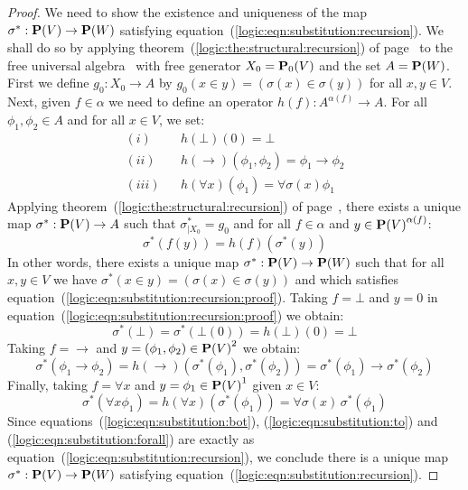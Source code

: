 \begin{proof}
    We need to show the existence and uniqueness of the map
    $\sigma^{*}:\mbox{${\bf P}(V)$}\to{\bf P}(W)$ satisfying
    equation~(\ref{logic:eqn:substitution:recursion}). We shall do so by
    applying theorem~(\ref{logic:the:structural:recursion}) of
    page~\pageref{logic:the:structural:recursion} to the free universal
    algebra \pv\ with free generator $X_{0}=\mbox{${\bf P}_{0}(V)$}$ and the set $A={\bf
    P}(W)$. First we define $g_{0}:X_{0}\to A$ by $g_{0}(x\in
    y)=(\sigma(x)\in\sigma(y))$ for all $x,y\in V$. Next, given
    $f\in\alpha$ we need to define an operator $h(f):A^{\alpha(f)}\to
    A$. For all $\phi_{1},\phi_{2}\in A$ and for all $x\in V$, we set:
    \begin{eqnarray*}
        (i)&&h(\bot)(0)=\bot
        \\
        (ii)&&h(\to)(\phi_{1},\phi_{2})=\phi_{1}\to\phi_{2}
        \\
        (iii)&&h(\forall x)(\phi_{1})=\forall \sigma(x)\phi_{1}
    \end{eqnarray*}
    Applying theorem~(\ref{logic:the:structural:recursion}) of
    page~\pageref{logic:the:structural:recursion}, there exists a unique
    map $\sigma^{*}:\mbox{${\bf P}(V)$}\to A$ such that $\sigma^{*}_{|X_{0}}=g_{0}$ and
    for all $f\in\alpha$ and $y\in\mbox{${\bf P}(V)$}^{\alpha(f)}$:
    \begin{equation}\label{logic:eqn:substitution:recursion:proof}
        \sigma^{*}(f(y))=h(f)(\sigma^{*}(y))
    \end{equation}
    In other words, there exists a unique map $\sigma^{*}:\mbox{${\bf P}(V)$}\to{\bf
    P}(W)$ such that for all $x,y\in V$ we have  $\sigma^{*}(x\in
    y)=(\sigma(x)\in\sigma(y))$  and which satisfies
    equation~(\ref{logic:eqn:substitution:recursion:proof}). Taking
    $f=\bot$ and $y=0$ in
    equation~(\ref{logic:eqn:substitution:recursion:proof}) we obtain:
    \begin{equation}\label{logic:eqn:substitution:bot}
        \sigma^{*}(\bot)=\sigma^{*}(\bot(0))=h(\bot)(0)=\bot
    \end{equation}
    Taking $f=\to$ and $y=(\phi_{1},\phi_{2})\in\mbox{${\bf P}(V)$}^{2}$ we obtain:
    \begin{equation}\label{logic:eqn:substitution:to}
        \sigma^{*}(\phi_{1}\to\phi_{2})
        =
        h(\to)(\sigma^{*}(\phi_{1}),\sigma^{*}(\phi_{2}))
        =
        \sigma^{*}(\phi_{1})\to\sigma^{*}(\phi_{2})
    \end{equation}
    Finally, taking $f=\forall x$ and $y=\phi_{1}\in\mbox{${\bf P}(V)$}^{1}$ given $x\in V$:
    \begin{equation}\label{logic:eqn:substitution:forall}
        \sigma^{*}(\forall x\phi_{1})
        =
        h(\forall x)(\sigma^{*}(\phi_{1}))
        =
        \forall\sigma(x)\,\sigma^{*}(\phi_{1})
    \end{equation}
    Since equations~(\ref{logic:eqn:substitution:bot}),
    (\ref{logic:eqn:substitution:to}) and
    (\ref{logic:eqn:substitution:forall}) are exactly as
    equation~(\ref{logic:eqn:substitution:recursion}), we conclude there
    is a unique map $\sigma^{*}:\mbox{${\bf P}(V)$}\to{\bf P}(W)$ satisfying
    equation~(\ref{logic:eqn:substitution:recursion}).
\end{proof}

